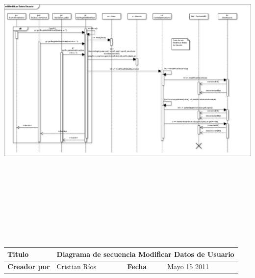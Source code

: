 				\begin{minipage}[c]{1\linewidth}
				\centering
    			\includegraphics[width=21cm, height=17cm, angle=90]
    			{diagramasSecuencia/ModificarDatos}\\[0.5cm]
    			
    			\begin{tabular}{|p{0.225\textwidth}|p{}|p{}
    			|p{}|}
			    \hline
			    {\bf Titulo} & 
			    \multicolumn{3}{p{0.675\textwidth}|}{Diagrama de secuencia Modificar Datos de Usuario}\\
			    \hline
			    \hline
			    {\bf Creador por} & {Cristian Ríos} & {\bf Fecha} & {Mayo 15 2011}\\
			    \hline
			    \end{tabular}
			    \end{minipage}
			    
			
